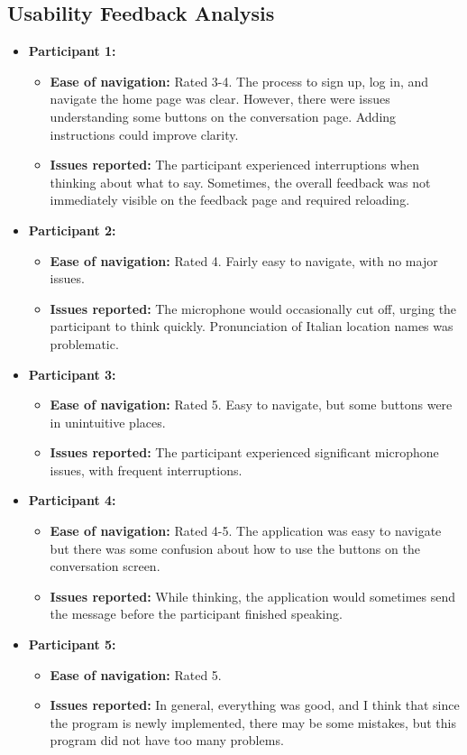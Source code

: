 \documentclass{article}
\begin{document}
\subsection{Usability Feedback Analysis}
\begin{itemize}
    \item \textbf{Participant 1:}
    \begin{itemize}
        \item \textbf{Ease of navigation:} Rated 3-4. The process to sign up, log in, and navigate the home page was clear. However, there were issues understanding some buttons on the conversation page. Adding instructions could improve clarity.
        \item \textbf{Issues reported:} The participant experienced interruptions when thinking about what to say. Sometimes, the overall feedback was not immediately visible on the feedback page and required reloading.
    \end{itemize}
    \item \textbf{Participant 2:}
    \begin{itemize}
        \item \textbf{Ease of navigation:} Rated 4. Fairly easy to navigate, with no major issues.
        \item \textbf{Issues reported:} The microphone would occasionally cut off, urging the participant to think quickly. Pronunciation of Italian location names was problematic.
    \end{itemize}
    \item \textbf{Participant 3:}
    \begin{itemize}
        \item \textbf{Ease of navigation:} Rated 5. Easy to navigate, but some buttons were in unintuitive places.
        \item \textbf{Issues reported:} The participant experienced significant microphone issues, with frequent interruptions.
    \end{itemize}
    \item \textbf{Participant 4:}
    \begin{itemize}
        \item \textbf{Ease of navigation:} Rated 4-5. The application was easy to navigate but there was some confusion about how to use the buttons on the conversation screen.
        \item \textbf{Issues reported:} While thinking, the application would sometimes send the message before the participant finished speaking.
    \end{itemize}
        \item \textbf{Participant 5:}
    \begin{itemize}
        \item \textbf{Ease of navigation:} Rated 5.
        \item \textbf{Issues reported:} In general, everything was good, and I think that since the program is newly implemented, there may be some mistakes, but this program did not have too many problems.
    \end{itemize}
\end{itemize}
\end{document}
